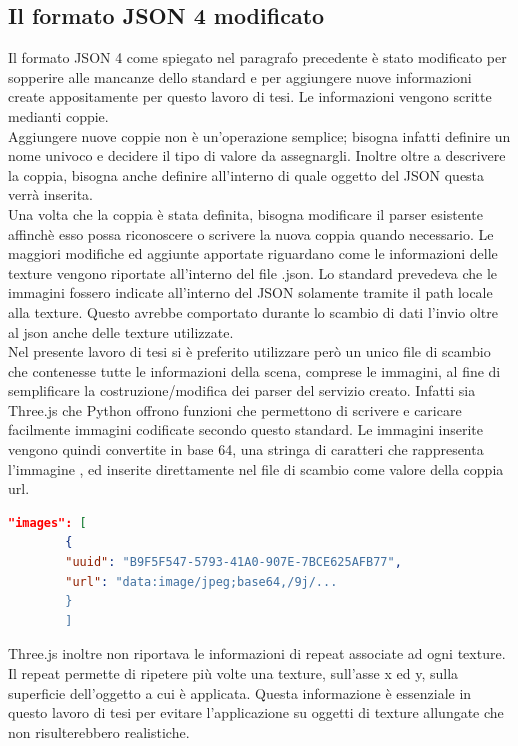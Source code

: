 \subsection{Il formato JSON 4 modificato}

Il formato JSON 4 come spiegato nel paragrafo precedente è stato modificato per sopperire alle mancanze dello standard e per aggiungere nuove informazioni create appositamente per questo lavoro di tesi. Le informazioni vengono scritte medianti coppie.
\\
Aggiungere nuove coppie non è un’operazione semplice; bisogna infatti definire un nome univoco e decidere il tipo di valore da assegnargli.
Inoltre oltre a descrivere la coppia, bisogna anche definire all’interno di quale oggetto del JSON questa verrà inserita.
\\
Una volta che la coppia è stata definita, bisogna modificare il parser esistente affinchè esso possa riconoscere o scrivere la nuova coppia quando necessario. 
Le maggiori modifiche ed aggiunte apportate riguardano come le informazioni delle texture vengono riportate all’interno del file .json.
Lo standard prevedeva che le immagini fossero indicate all’interno del JSON solamente tramite il path locale alla texture. Questo avrebbe comportato durante lo scambio di dati l’invio oltre al json anche delle texture utilizzate.
\\
Nel presente lavoro di tesi si è preferito utilizzare però un unico file di scambio che contenesse tutte le informazioni della scena, comprese le immagini, al fine di semplificare la costruzione/modifica dei parser del servizio creato. Infatti sia Three.js che Python offrono funzioni che permettono di scrivere e caricare facilmente immagini codificate secondo questo standard.
Le immagini inserite vengono quindi convertite in base 64, una stringa di caratteri che rappresenta l’immagine , ed inserite direttamente nel file di scambio come valore della coppia url.
\begin{lstlisting}[language=json]
"images": [
        {
        "uuid": "B9F5F547-5793-41A0-907E-7BCE625AFB77",
        "url": "data:image/jpeg;base64,/9j/...
        }
        ]
\end{lstlisting}
Three.js inoltre non riportava le informazioni di repeat associate ad ogni texture. 
Il repeat permette di ripetere più volte una texture, sull’asse x ed y, sulla superficie dell’oggetto a cui è applicata. Questa informazione è essenziale in questo lavoro di tesi per evitare l'applicazione su oggetti di texture allungate che non risulterebbero realistiche.
